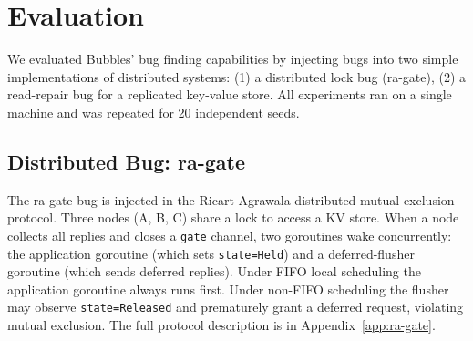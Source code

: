 \documentclass[11pt]{article}
\begin{document}




\section{Evaluation}

We evaluated Bubbles' bug finding capabilities by injecting bugs into two simple implementations of distributed systems: (1) a distributed lock bug (ra-gate), (2) a read-repair bug for a replicated key-value store. All experiments ran on a single machine and was repeated for 20 independent seeds. 

\subsection{Distributed Bug: ra-gate}

The ra-gate bug is injected in the Ricart-Agrawala distributed mutual exclusion protocol. Three nodes (A, B, C) share a lock to access a KV store. When a node collects all replies and closes a \texttt{gate} channel, two goroutines wake concurrently: the application goroutine (which sets \texttt{state=Held}) and a deferred-flusher goroutine (which sends deferred replies). Under FIFO local scheduling the application goroutine always runs first. Under non-FIFO scheduling the flusher may observe \texttt{state=Released} and prematurely grant a deferred request, violating mutual exclusion. The full protocol description is in Appendix~\ref{app:ra-gate}.
\end{document}
